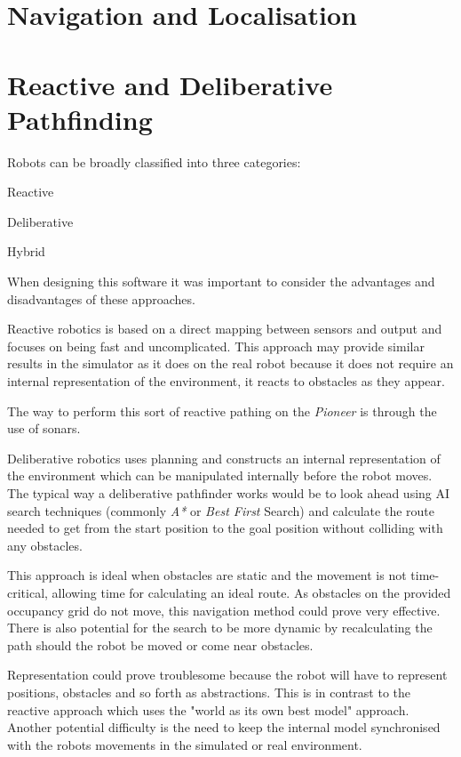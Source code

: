 \documentclass[a4paper,12pt]{article}
\begin{document}
\section{Navigation and Localisation}
\section{Reactive and Deliberative Pathfinding}
Robots can be broadly classified into three categories:

\begin{arrowlist}
    \item{Reactive}
    \item{Deliberative}
    \item{Hybrid}
\end{arrowlist}
When designing this software it was important to consider the advantages and disadvantages of these approaches. 

Reactive robotics is based on a direct mapping between sensors and output and focuses on being fast and uncomplicated. This approach may provide similar results in the simulator as it does on the real robot because it does not require an internal representation of the environment, it reacts to obstacles as they appear.

The way to perform this sort of reactive pathing on the \textit{Pioneer} is through the use of sonars.

Deliberative robotics uses planning and constructs an internal representation of the environment which can be manipulated internally before the robot moves. The typical way a deliberative pathfinder works would be to look ahead using AI search techniques (commonly \textit{A*} or \textit{Best First} Search) and calculate the route needed to get from the start position to the goal position without colliding with any obstacles.

This approach is ideal when obstacles are static and the movement is not time-critical, allowing time for calculating an ideal route. As obstacles on the provided occupancy grid do not move, this navigation method could prove very effective. There is also potential for the search to be more dynamic by recalculating the path should the robot be moved or come near obstacles.

Representation could prove troublesome because the robot will have to represent positions, obstacles and so forth as abstractions. This is in contrast to the reactive approach which uses the "world as its own best model" approach. Another potential difficulty is the need to keep the internal model synchronised with the robots movements in the simulated or real environment.
\end{document}
